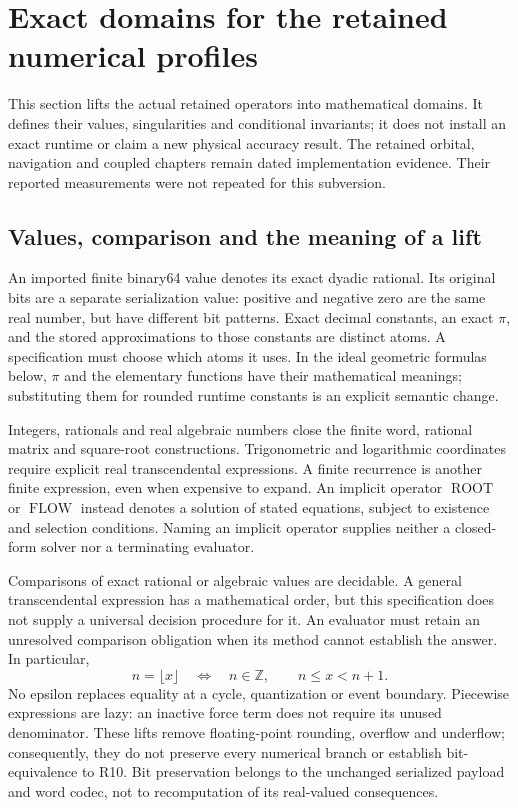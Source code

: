 \section{Exact domains for the retained numerical profiles}
\label{sec:exact-domains}
This section lifts the actual retained operators into mathematical domains. It
defines their values, singularities and conditional invariants; it does not
install an exact runtime or claim a new physical accuracy result. The retained
orbital, navigation and coupled chapters remain dated implementation evidence.
Their reported measurements were not repeated for this subversion.

\subsection{Values, comparison and the meaning of a lift}
\label{sec:lift-values}
An imported finite binary64 value denotes its exact dyadic rational. Its original
bits are a separate serialization value: positive and negative zero are the same
real number, but have different bit patterns. Exact decimal constants, an exact
$\pi$, and the stored approximations to those constants are distinct atoms. A
specification must choose which atoms it uses. In the ideal geometric formulas
below, $\pi$ and the elementary functions have their mathematical meanings;
substituting them for rounded runtime constants is an explicit semantic change.

Integers, rationals and real algebraic numbers close the finite word, rational
matrix and square-root constructions. Trigonometric and logarithmic coordinates
require explicit real transcendental expressions. A finite recurrence is another
finite expression, even when expensive to expand. An implicit operator
$\operatorname{ROOT}$ or $\operatorname{FLOW}$ instead denotes a solution of stated
equations, subject to existence and selection conditions. Naming an implicit
operator supplies neither a closed-form solver nor a terminating evaluator.

Comparisons of exact rational or algebraic values are decidable. A general
transcendental expression has a mathematical order, but this specification does
not supply a universal decision procedure for it. An evaluator must retain an
unresolved comparison obligation when its method cannot establish the answer.
In particular,
\begin{equation}
 n=\lfloor x\rfloor\quad\Longleftrightarrow\quad n\in\mathbb Z,
 \qquad n\le x<n+1 .
\end{equation}
No epsilon replaces equality at a cycle, quantization or event boundary.
Piecewise expressions are lazy: an inactive force term does not require its
unused denominator. These lifts remove floating-point rounding, overflow and
underflow; consequently, they do not preserve every numerical branch or establish
bit-equivalence to R10. Bit preservation belongs to the unchanged serialized
payload and word codec, not to recomputation of its real-valued consequences.

